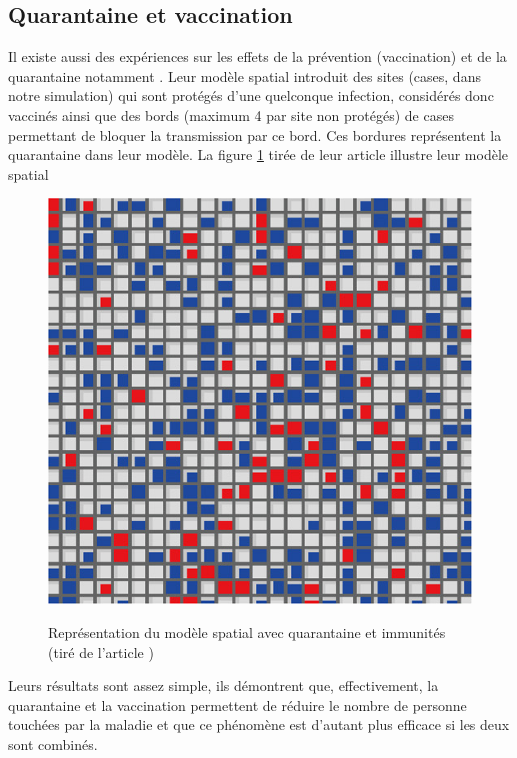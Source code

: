 \documentclass[journal, a4paper]{IEEEtran}
\begin{document}
	 \subsection{Quarantaine et vaccination}
	 Il existe aussi des expériences sur les effets de la prévention (vaccination) et de la quarantaine notamment \cite{Kato2011}. Leur modèle spatial introduit des sites (cases, dans notre simulation) qui sont protégés d'une quelconque infection, considérés donc vaccinés ainsi que des bords (maximum 4 par site non protégés) de cases permettant de bloquer la transmission par ce bord. Ces bordures représentent la quarantaine dans leur modèle. La figure \ref{fig:quarantine_model} tirée de leur article illustre leur modèle spatial
	 \begin{figure}[!hbt]
		 \caption{Représentation du modèle spatial avec quarantaine et immunités (tiré de l'article \cite{Kato2011})}
		 \includegraphics[width=\columnwidth]{quarantine_model}
		 \label{fig:quarantine_model}

	 \end{figure}

	 Leurs résultats sont assez simple, ils démontrent que, effectivement, la quarantaine et la vaccination permettent de réduire le nombre de personne touchées par la maladie et que ce phénomène est d'autant plus efficace si les deux sont combinés.
\end{document}
